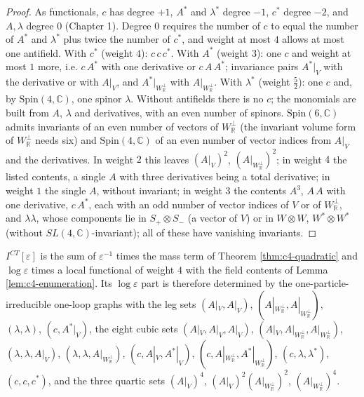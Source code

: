 \begin{proof}
As functionals, $c$ has degree $+1$, $A^*$ and $\lambda^*$ degree $-1$, $c^*$ degree $-2$, and $A,\lambda$ degree $0$ (Chapter 1). Degree $0$ requires the number of $c$ to equal the number of $A^*$ and $\lambda^*$ plus twice the number of $c^*$, and weight at most $4$ allows at most one antifield. With $c^*$ (weight $4$): $c\,c\,c^*$. With $A^*$ (weight $3$): one $c$ and weight at most $1$ more, i.e. $c\,A^*$ with one derivative or $c\,A\,A^*$; invariance pairs $A^*|_V$ with the derivative or with $A|_V$, and $A^*|_{W_{\mathbb R}^\perp}$ with $A|_{W_{\mathbb R}^\perp}$. With $\lambda^*$ (weight $\tfrac52$): one $c$ and, by $\mathrm{Spin}(4,\mathbb C)$, one spinor $\lambda$. Without antifields there is no $c$; the monomials are built from $A$, $\lambda$ and derivatives, with an even number of spinors. $\mathrm{Spin}(6,\mathbb C)$ admits invariants of an even number of vectors of $W_{\mathbb R}^\perp$ (the invariant volume form of $W_{\mathbb R}^\perp$ needs six) and $\mathrm{Spin}(4,\mathbb C)$ of an even number of vector indices from $A|_V$ and the derivatives. In weight $2$ this leaves $(A|_V)^2$, $(A|_{W_{\mathbb R}^\perp})^2$; in weight $4$ the listed contents, a single $A$ with three derivatives being a total derivative; in weight $1$ the single $A$, without invariant; in weight $3$ the contents $A^3$, $A\,A$ with one derivative, $c\,A^*$, each with an odd number of vector indices of $V$ or of $W_{\mathbb R}^\perp$, and $\lambda\lambda$, whose components lie in $S_+\otimes S_-$ (a vector of $V$) or in $W\otimes W$, $W^*\otimes W^*$ (without $SL(4,\mathbb C)$-invariant); all of these have vanishing invariants.
\end{proof}

\begin{proposition}
\label{prop:c4-structure}
$I^{CT}[\varepsilon]$ is the sum of $\varepsilon^{-1}$ times the mass term of Theorem \ref{thm:c4-quadratic} and $\log\varepsilon$ times a local functional of weight $4$ with the field contents of Lemma \ref{lem:c4-enumeration}. Its $\log\varepsilon$ part is therefore determined by the one-particle-irreducible one-loop graphs with the leg sets $(A|_V,A|_V)$, $(A|_{W_{\mathbb R}^\perp},A|_{W_{\mathbb R}^\perp})$, $(\lambda,\lambda)$, $(c,A^*|_V)$, the eight cubic sets $(A|_V,A|_V,A|_V)$, $(A|_V,A|_{W_{\mathbb R}^\perp},A|_{W_{\mathbb R}^\perp})$, $(\lambda,\lambda,A|_V)$, $(\lambda,\lambda,A|_{W_{\mathbb R}^\perp})$, $(c,A|_V,A^*|_V)$, $(c,A|_{W_{\mathbb R}^\perp},A^*|_{W_{\mathbb R}^\perp})$, $(c,\lambda,\lambda^*)$, $(c,c,c^*)$, and the three quartic sets $(A|_V)^4$, $(A|_V)^2(A|_{W_{\mathbb R}^\perp})^2$, $(A|_{W_{\mathbb R}^\perp})^4$.
\end{proposition}

